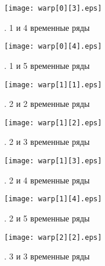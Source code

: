 \documentclass[12pt, twoside]{article}
\begin{document}
\begin{figure}[H]
\centering
\begin{minipage}{0.66\textwidth}
\texttt{[image: warp[0][3].eps]}
\end{minipage}%
\caption{ . 1 и 4 временные ряды}
\label{fig:2}
\end{figure}

\begin{figure}[H]
\centering
\begin{minipage}{0.66\textwidth}
\texttt{[image: warp[0][4].eps]}
\end{minipage}%
\caption{ . 1 и 5 временные ряды}
\label{fig:2}
\end{figure}

\begin{figure}[H]
\centering
\begin{minipage}{0.66\textwidth}
\texttt{[image: warp[1][1].eps]}
\end{minipage}%
\caption{ . 2 и 2 временные ряды}
\label{fig:2}
\end{figure}

\begin{figure}[H]
\centering
\begin{minipage}{0.66\textwidth}
\texttt{[image: warp[1][2].eps]}
\end{minipage}%
\caption{ . 2 и 3 временные ряды}
\label{fig:2}
\end{figure}

\begin{figure}[H]
\centering
\begin{minipage}{0.66\textwidth}
\texttt{[image: warp[1][3].eps]}
\end{minipage}%
\caption{ . 2 и 4 временные ряды}
\label{fig:2}
\end{figure}

\begin{figure}[H]
\centering
\begin{minipage}{0.66\textwidth}
\texttt{[image: warp[1][4].eps]}
\end{minipage}%
\caption{ . 2 и 5 временные ряды}
\label{fig:2}
\end{figure}

\begin{figure}[H]
\centering
\begin{minipage}{0.66\textwidth}
\texttt{[image: warp[2][2].eps]}
\end{minipage}%
\caption{ . 3 и 3 временные ряды}
\label{fig:2}
\end{figure}
\end{document}
